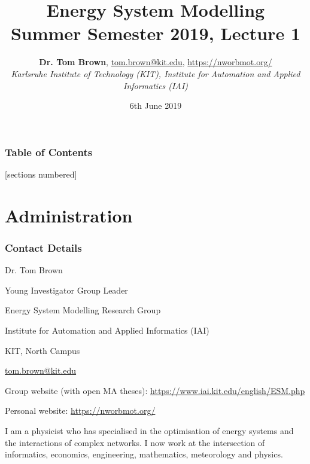 \documentclass[10pt,aspectratio=169,dvipsnames]{beamer}
\title{Energy System Modelling\\ Summer Semester 2019, Lecture 1}
\author{
  {\bf Dr. Tom Brown}, \href{mailto:tom.brown@kit.edu}{tom.brown@kit.edu}, \url{https://nworbmot.org/}\\
  \emph{Karlsruhe Institute of Technology (KIT), Institute for Automation and Applied Informatics (IAI)}
}
\date{\vspace{.3cm}6th June 2019}
\begin{document}
\maketitle


\begin{frame}

  \frametitle{Table of Contents}
  [sections numbered]
  \tableofcontents[hideallsubsections]
\end{frame}


\section{Administration}




\begin{frame}
  \frametitle{Contact Details}

  Dr. Tom Brown

  Young Investigator Group Leader

  Energy System Modelling Research Group

  Institute for Automation and Applied Informatics (IAI)

  KIT, North Campus

  \href{mailto:tom.brown@kit.edu}{tom.brown@kit.edu}

  Group website (with \alert{open MA theses}): \url{https://www.iai.kit.edu/english/ESM.php}

  Personal website: \url{https://nworbmot.org/}

I am a physicist who has specialised in the optimisation of energy
systems and the interactions of complex networks. I now work at the
intersection of informatics, economics, engineering, mathematics,
meteorology and physics.

\end{frame}
\end{document}
